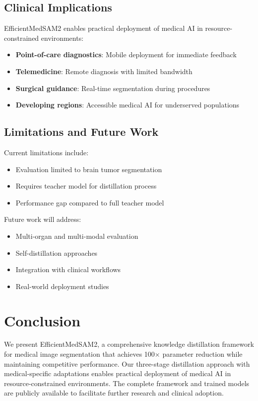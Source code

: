 \documentclass[conference]{IEEEtran}
\begin{document}
\subsection{Clinical Implications}

EfficientMedSAM2 enables practical deployment of medical AI in resource-constrained environments:

\begin{itemize}
    \item \textbf{Point-of-care diagnostics}: Mobile deployment for immediate feedback
    \item \textbf{Telemedicine}: Remote diagnosis with limited bandwidth
    \item \textbf{Surgical guidance}: Real-time segmentation during procedures
    \item \textbf{Developing regions}: Accessible medical AI for underserved populations
\end{itemize}

\subsection{Limitations and Future Work}

Current limitations include:
\begin{itemize}
    \item Evaluation limited to brain tumor segmentation
    \item Requires teacher model for distillation process
    \item Performance gap compared to full teacher model
\end{itemize}

Future work will address:
\begin{itemize}
    \item Multi-organ and multi-modal evaluation
    \item Self-distillation approaches
    \item Integration with clinical workflows
    \item Real-world deployment studies
\end{itemize}

\section{Conclusion}

We present EfficientMedSAM2, a comprehensive knowledge distillation framework for medical image segmentation that achieves 100× parameter reduction while maintaining competitive performance. Our three-stage distillation approach with medical-specific adaptations enables practical deployment of medical AI in resource-constrained environments. The complete framework and trained models are publicly available to facilitate further research and clinical adoption.
\end{document}
